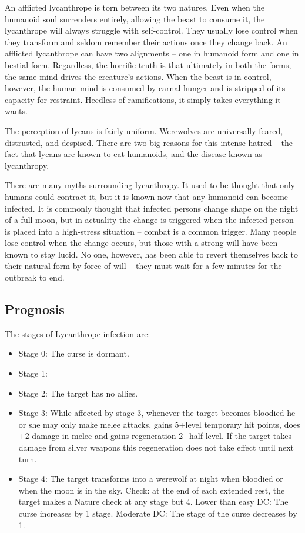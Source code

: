\documentclass[a4paper]{dnd5}
\begin{document}
An afflicted lycanthrope is torn between its two natures. Even when the humanoid soul surrenders entirely, allowing the beast to consume it, the lycanthrope will always struggle with self-control. They usually lose control when they transform and seldom remember their actions once they change back. An afflicted lycanthrope can have two alignments -- one in humanoid form and one in bestial form. Regardless, the horrific truth is that ultimately in both the forms, the same mind drives the creature's actions. When the beast is in control, however, the human mind is consumed by carnal hunger and is stripped of its capacity for restraint. Heedless of ramifications, it simply takes everything it wants.

The perception of lycans is fairly uniform. Werewolves are universally feared, distrusted, and despised. There are two big reasons for this intense hatred – the fact that lycans are known to eat humanoids, and the disease known as lycanthropy.

There are many myths surrounding lycanthropy. It used to be thought that only humans could contract it, but it is known now that any humanoid can become infected. It is commonly thought that infected persons change shape on the night of a full moon, but in actuality the change is triggered when the infected person is placed into a high-stress situation – combat is a common trigger. Many people lose control when the change occurs, but those with a strong will have been known to stay lucid. No one, however, has been able to revert themselves back to their natural form by force of will – they must wait for a few minutes for the outbreak to end. 




\subsection{Prognosis}


The stages of Lycanthrope infection are:
\begin{itemize}
\item Stage 0: The curse is dormant.
\item Stage 1: 
\item Stage 2: The target has no allies.
\item Stage 3: While affected by stage 3, whenever the target becomes bloodied he or she may only make melee attacks, gains 5+level temporary hit points, does +2 damage in melee and gains regeneration 2+half level. If the target takes damage from silver weapons this regeneration does not take effect until next turn.
\item Stage 4: The target transforms into a werewolf at night when bloodied or when the moon is in the sky.
Check: at the end of each extended rest, the target makes a Nature check at any stage but 4.
Lower than easy DC: The curse increases by 1 stage.
Moderate DC: The stage of the curse decreases by 1.
\end{itemize}
\end{document}

